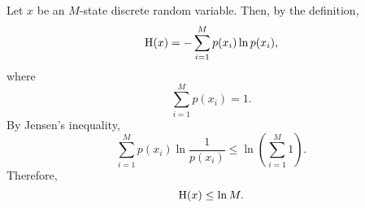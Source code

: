 \subsection{}
\label{1.29}
Let $x$ be an $M$-state discrete random variable.
Then, by the definition,
%
\begin{equation}
{\rm H} (x) = - \sum_{i = 1}^{M} p(x_i) \ln p(x_i),
\end{equation}
%
where
%
\begin{equation}
\sum_{i = 1}^{M} p(x_i) = 1.
\end{equation}
%
By Jensen's inequality,
%
\begin{equation}
\sum_{i = 1}^{M} p(x_i) \ln \frac{1}{p(x_i)} \leq \ln \left( \sum_{i = 1}^{M} 1 \right).
\end{equation}
Therefore,
%
\begin{equation}
{\rm H} (x) \leq \ln M.
\end{equation}
%


